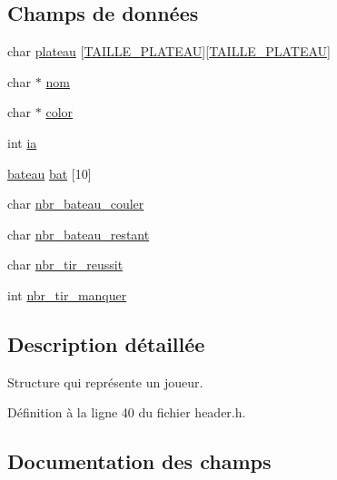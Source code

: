 \subsection*{Champs de données}
\begin{DoxyCompactItemize}
\item 
char \mbox{\hyperlink{structjoueur_a0de66c3578a57ff8e0ed1bf3d91c8e82}{plateau}} \mbox{[}\mbox{\hyperlink{header_8h_adc3c2556e84bebbe78c8a87fc459a6f8}{T\+A\+I\+L\+L\+E\+\_\+\+P\+L\+A\+T\+E\+AU}}\mbox{]}\mbox{[}\mbox{\hyperlink{header_8h_adc3c2556e84bebbe78c8a87fc459a6f8}{T\+A\+I\+L\+L\+E\+\_\+\+P\+L\+A\+T\+E\+AU}}\mbox{]}
\item 
char $\ast$ \mbox{\hyperlink{structjoueur_a5228c842828b2639253cb7db01e6f72d}{nom}}
\item 
char $\ast$ \mbox{\hyperlink{structjoueur_a1064ba94d4d2719446f3c609135ba362}{color}}
\item 
int \mbox{\hyperlink{structjoueur_a307e3b4b4c1b78e753c599bc1f6a47c3}{ia}}
\item 
\mbox{\hyperlink{structbateau}{bateau}} \mbox{\hyperlink{structjoueur_a3b21aa14ce27f69126dc9a649b363146}{bat}} \mbox{[}10\mbox{]}
\item 
char \mbox{\hyperlink{structjoueur_ab0c0fa544d83148d4daed41c84954e55}{nbr\+\_\+bateau\+\_\+couler}}
\item 
char \mbox{\hyperlink{structjoueur_a4f902c486f8d66cb85cf3b07abd0bd12}{nbr\+\_\+bateau\+\_\+restant}}
\item 
char \mbox{\hyperlink{structjoueur_a19510a02b4ff3f6336da487b50806d71}{nbr\+\_\+tir\+\_\+reussit}}
\item 
int \mbox{\hyperlink{structjoueur_aaba095a23d03a15d363924e77caa3c1e}{nbr\+\_\+tir\+\_\+manquer}}
\end{DoxyCompactItemize}


\subsection{Description détaillée}
Structure qui représente un joueur. 

Définition à la ligne 40 du fichier header.\+h.



\subsection{Documentation des champs}
\mbox{\label{structjoueur_a3b21aa14ce27f69126dc9a649b363146}} 
